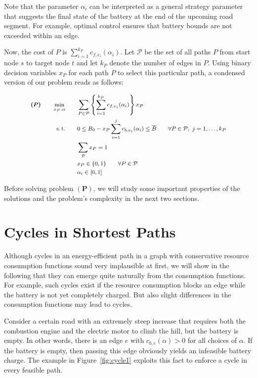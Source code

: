 \documentclass[a4paper]{scrartcl}
\renewcommand{\bar}[1]{\overline{#1}}
\begin{document}
Note that the parameter $\alpha_i$ can be interpreted as a general strategy parameter that suggests the final state of the battery at the end of the upcoming road segment. For example, optimal control ensures that battery bounds are not exceeded within an edge.

Now, the cost of $P$ is $\sum_{i=1}^{k_P} c_{f,e_i}(\alpha_{i})$. Let $\mathcal{P}$ be the set of all paths $P$ from start node $s$ to target node $t$ and let $k_P$ denote the number of edges in $P$. Using binary decision variables $x_P$ for each path $P$ to select this particular path, a condensed version of our problem reads as follows:

\begin{subequations}\footnotesize
\begin{align}
 \bm{(P)}\qquad \min_{x_P,\alpha} \qquad &\sum_{P\in\mathcal{P}} \left\lbrace  \sum_{i=1}^{k_P} c_{f,e_i}(\alpha_i) \right\rbrace x_P \label{eq:problem:objective}  \\
 \operatorname{s.t.} \qquad & 0\le B_0 - x_P\sum_{i=1}^{j} c_{b,e_i}(\alpha_i)  \le \bar{B} \qquad  \forall P\in\mathcal{P},~ j=1,\dots,k_P \label{eq:problem:feasible}\\
 & \sum_{\mathcal{P}} x_P =1\\
 & x_P \in \{0,1\} \qquad \forall P \in \mathcal{P}\label{eq:problem:01-rest} \\
 & \alpha_i \in [0,1] \label{eq:problem:alpha-rest}
\end{align}
\end{subequations}

Before solving problem $\bm{(P)}$, we will study some important properties of the solutions and the problem's complexity in the next two sections.


\section{Cycles in Shortest Paths}\label{sec:complexity}

Although cycles in an energy-efficient path in a graph with conservative resource consumption functions sound very implausible at first, we will show in the following that they can emerge quite naturally from the consumption functions. For example, such cycles exist if the resource consumption blocks an edge while the battery is not yet completely charged. But also slight differences in the consumption functions may lead to cycles.

Consider a certain road with an extremely steep increase that requires both the combustion engine and the electric motor to climb the hill, but the battery is empty. In other words, there is an edge $e$ with $c_{b,e}(\alpha)>0$ for all choices of $\alpha$. If the battery is empty, then passing this edge obviously yields an infeasible battery charge. The example in Figure~\ref{fig:cycle1} exploits this fact to enforce a cycle in every feasible path.
\end{document}
